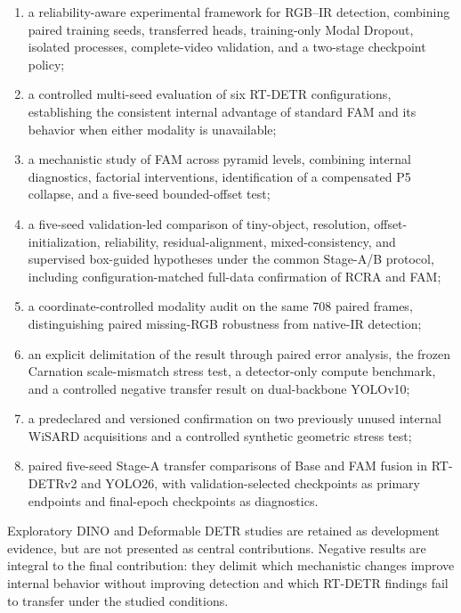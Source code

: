 \begin{enumerate}[label=\arabic*.]
  \item a reliability-aware experimental framework for RGB--IR detection,
        combining paired training seeds, transferred heads, training-only
        Modal Dropout, isolated processes, complete-video validation, and a
        two-stage checkpoint policy;
  \item a controlled multi-seed evaluation of six RT-DETR configurations,
        establishing the consistent internal advantage of standard FAM and its
        behavior when either modality is unavailable;
  \item a mechanistic study of FAM across pyramid levels, combining internal
        diagnostics, factorial interventions, identification of a compensated
        P5 collapse, and a five-seed bounded-offset test;
  \item a five-seed validation-led comparison of tiny-object, resolution,
        offset-initialization, reliability, residual-alignment,
        mixed-consistency, and supervised box-guided hypotheses under the
        common Stage-A/B protocol, including
        configuration-matched full-data confirmation of RCRA and FAM;
  \item a coordinate-controlled modality audit on the same 708 paired frames,
        distinguishing paired missing-RGB robustness from native-IR detection;
  \item an explicit delimitation of the result through paired error analysis,
        the frozen Carnation scale-mismatch stress test, a detector-only
        compute benchmark, and a controlled negative transfer result on
        dual-backbone YOLOv10;
  \item a predeclared and versioned confirmation on two previously unused
        internal WiSARD acquisitions and a controlled synthetic geometric
        stress test;
  \item paired five-seed Stage-A transfer comparisons of Base and FAM
        fusion in RT-DETRv2 and YOLO26, with validation-selected checkpoints
        as primary endpoints and final-epoch checkpoints as diagnostics.
\end{enumerate}

Exploratory DINO and Deformable DETR studies are retained as development
evidence, but are not presented as central contributions. Negative results are
integral to the final contribution: they delimit which mechanistic changes
improve internal behavior without improving detection and which RT-DETR
findings fail to transfer under the studied conditions.


